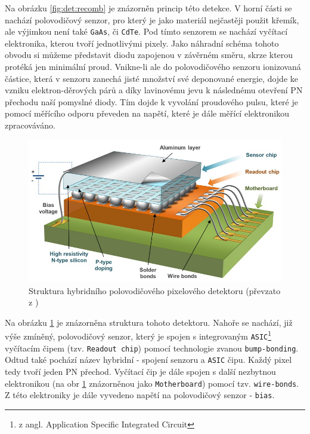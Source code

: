 Na obrázku \ref{fig:det:recomb} je znázorněn princip této detekce. V horní části se nachází polovodičový senzor, pro který je jako materiál nejčastěji použit křemík, ale výjimkou není také \texttt{GaAs}, či \texttt{CdTe}. Pod tímto senzorem se nachází vyčítací elektronika, kterou tvoří jednotlivými pixely. Jako náhradní schéma tohoto obvodu si můžeme představit diodu zapojenou v závěrném směru, skrze kterou protéká jen minimální proud. Vnikne-li ale do polovodičového senzoru ionizovaná částice, která v senzoru zanechá jisté množství své deponované energie, dojde ke vzniku elektron-děrových párů a díky lavinovému jevu k následnému otevření PN přechodu naší pomyslné diody. Tím dojde k vyvolání proudového pulsu, které je pomocí měřícího odporu převeden na napětí, které je dále měřící elektronikou zpracováváno.

\begin{figure}[th]
	\begin{center}
		\includegraphics[width=12cm]{figures/det_chip.png}
		\caption{Struktura hybridního polovodičového pixelového detektoru (převzato z \cite{PlatkevicDisertace})}
		\label{fig:det:chip}
	\end{center}
\end{figure}

Na obrázku \ref{fig:det:chip} je znázorněna struktura tohoto detektoru. Nahoře se nachází, již výše zmíněný, polovodičový senzor, který je spojen s integrovaným \texttt{ASIC}\footnote{z angl. Application Specific Integrated Circuit} vyčítacím čipem (tzv. \texttt{Readout chip}) pomocí technologie zvanou \texttt{bump-bonding}. Odtud také pochází název hybridní - spojení senzoru a \texttt{ASIC} čipu. Každý pixel tedy tvoří jeden PN přechod. Vyčítací čip je dále spojen s další nezbytnou elektronikou (na obr \ref{fig:det:chip} znázorněnou jako \texttt{Motherboard}) pomocí tzv. \texttt{wire-bonds}. Z této elektroniky je dále vyvedeno napětí na polovodičový senzor - \texttt{bias}.

